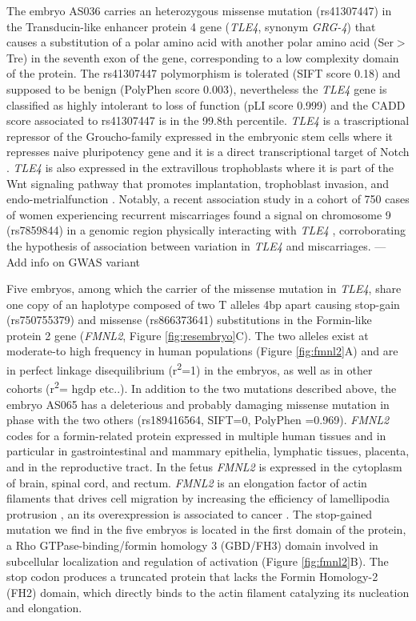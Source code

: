 The embryo AS036 carries an heterozygous missense mutation (rs41307447) in the Transducin-like enhancer protein 4 gene (\textit{TLE4}, synonym \textit{GRG-4}) that causes a substitution of a polar amino acid with another polar amino acid (Ser$>$Tre) in the seventh exon of the gene, corresponding to a low complexity domain of the protein. The rs41307447 polymorphism is tolerated (SIFT score 0.18) and supposed to be benign (PolyPhen score 0.003), nevertheless the \textit{TLE4} gene is classified as highly intolerant to loss of function (pLI score 0.999) and the CADD score associated to rs41307447 is in the 99.8th percentile. 
\textit{TLE4} is a trascriptional repressor of the Groucho-family expressed in the embryonic stem cells where it represses naive pluripotency gene \cite{laing2015gro} and it is a direct transcriptional target of Notch \cite{menchero2019transitions}. \textit{TLE4} is also expressed in the extravillous trophoblasts \cite{meinhardt2014wnt} where it is part of the Wnt signaling pathway that promotes implantation, trophoblast invasion, and endo-metrialfunction \cite{sonderegger2010wnt}. Notably, a recent association study in a cohort of 750 cases of women experiencing recurrent miscarriages found a signal on chromosome 9 (rs7859844) in a genomic region physically interacting with \textit{TLE4} \cite{laisk2020genetic}, corroborating the hypothesis of association between variation in \textit{TLE4} and miscarriages. --- Add info on GWAS variant 

Five embryos, among which the carrier of the missense mutation in \textit{TLE4}, share one copy of an haplotype composed of two T alleles 4bp apart causing stop-gain (rs750755379) and missense (rs866373641) substitutions in the Formin-like protein 2 gene (\textit{FMNL2}, Figure \ref{fig:resembryo}C). The two alleles exist at moderate-to high frequency in human populations (Figure \ref{fig:fmnl2}A) and are in perfect linkage disequilibrium (r\textsuperscript{2}=1) in the embryos, as well as in other cohorts (r\textsuperscript{2}= hgdp etc..). In addition to the two mutations described above, the embryo AS065 has a deleterious and probably damaging missense mutation in phase with the two others (rs189416564, SIFT=0, PolyPhen =0.969). \textit{FMNL2} codes for a formin-related protein expressed in multiple human tissues and in particular in gastrointestinal and mammary epithelia, lymphatic tissues, placenta, and in the reproductive tract\cite{gardberg2010characterization}. In the fetus \textit{FMNL2} is expressed in the cytoplasm of brain, spinal cord, and rectum\cite{lizio2015gateways}. \textit{FMNL2} is an elongation factor of actin filaments that drives cell migration by increasing the efficiency of lamellipodia protrusion \cite{block2012fmnl2, kuhn2015structure}, an its overexpression is associated to cancer \cite{zhu2011fmnl2}. The stop-gained mutation we find in the five embryos is located in the first domain of the protein, a Rho GTPase-binding/formin homology 3 (GBD/FH3) domain involved in subcellular localization and regulation of activation (Figure \ref{fig:fmnl2}B). The stop codon produces a truncated protein that lacks the Formin Homology-2 (FH2) domain, which directly binds to the actin filament catalyzing its nucleation and elongation.